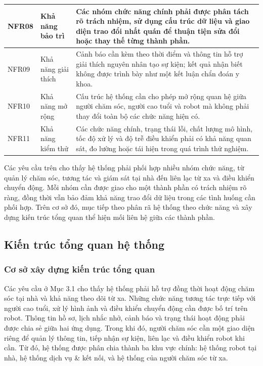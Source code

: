\begin{longtable}{|p{1.4cm}|p{3.1cm}|p{8.7cm}|}
\hline
NFR08 & Khả năng bảo trì & Các nhóm chức năng chính phải được phân tách rõ trách nhiệm, sử dụng cấu trúc dữ liệu và giao diện trao đổi nhất quán để thuận tiện sửa đổi hoặc thay thế từng thành phần. \\
\hline
NFR09 & Khả năng giải thích & Cảnh báo cần kèm theo thời điểm và thông tin hỗ trợ giải thích nguyên nhân tạo sự kiện; kết quả nhận biết không được trình bày như một kết luận chẩn đoán y khoa. \\
\hline
NFR10 & Khả năng mở rộng & Cấu trúc hệ thống cần cho phép mở rộng quan hệ giữa người chăm sóc, người cao tuổi và robot mà không phải thay đổi toàn bộ các chức năng hiện có. \\
\hline
NFR11 & Khả năng kiểm thử & Các chức năng chính, trạng thái lỗi, chất lượng mô hình, tốc độ xử lý và độ trễ điều khiển phải có khả năng quan sát, đo lường hoặc tái hiện trong quá trình thử nghiệm. \\
\hline
\end{longtable}

Các yêu cầu trên cho thấy hệ thống phải phối hợp nhiều nhóm chức năng, từ quản lý chăm sóc, tương tác và giám sát tại nhà đến liên lạc từ xa và điều khiển chuyển động. Mỗi nhóm cần được giao cho một thành phần có trách nhiệm rõ ràng, đồng thời vẫn bảo đảm khả năng trao đổi dữ liệu trong các tình huống cần phối hợp. Trên cơ sở đó, mục tiếp theo phân rã hệ thống theo chức năng và xây dựng kiến trúc tổng quan thể hiện mối liên hệ giữa các thành phần.

\subsection{Kiến trúc tổng quan hệ thống}

\subsubsection{Cơ sở xây dựng kiến trúc tổng quan}

Các yêu cầu ở Mục 3.1 cho thấy hệ thống phải hỗ trợ đồng thời hoạt động chăm sóc tại nhà và khả năng theo dõi từ xa. Những chức năng tương tác trực tiếp với người cao tuổi, xử lý hình ảnh và điều khiển chuyển động cần được bố trí trên robot. Thông tin hồ sơ, lịch nhắc nhở, cảnh báo và trạng thái hoạt động phải được chia sẻ giữa hai ứng dụng. Trong khi đó, người chăm sóc cần một giao diện riêng để quản lý thông tin, tiếp nhận sự kiện, liên lạc và điều khiển robot khi cần. Từ đó, hệ thống được phân chia thành ba khu vực chính: hệ thống robot tại nhà, hệ thống dịch vụ \& kết nối, và hệ thống của người chăm sóc từ xa.

